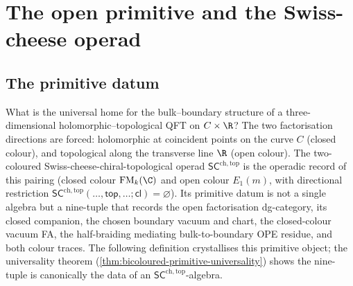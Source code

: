 \providecommand{\Tr}{\operatorname{Tr}}
\providecommand{\Dmod}{D\text{-}\mathsf{mod}}
\providecommand{\Ran}{\mathrm{Ran}}
\providecommand{\Fact}{\mathrm{Fact}}
\providecommand{\Conf}{\mathrm{Conf}}
\providecommand{\IndCoh}{\operatorname{IndCoh}}
\providecommand{\FM}{\mathrm{FM}}
\providecommand{\barB}{\overline{B}}
\providecommand{\SCchtop}{\mathsf{SC}^{\mathrm{ch},\mathrm{top}}}
\providecommand{\RHom}{\mathrm{R}\mathrm{Hom}}
\providecommand{\Repq}{\mathrm{Rep}_q}
\providecommand{\ev}{\mathrm{ev}}
\providecommand{\coev}{\mathrm{coev}}
\providecommand{\ChirHoch}{\mathrm{Ch}\mathrm{Hoch}}
\providecommand{\MHM}{\mathrm{MHM}}
\providecommand{\KZ}{\mathrm{KZ}}
\providecommand{\GRT}{\mathrm{GRT}}
\providecommand{\End}{\mathrm{End}}
\providecommand{\Hom}{\mathrm{Hom}}
\providecommand{\holim}{\mathrm{holim}}
\providecommand{\id}{\mathrm{id}}
\providecommand{\Dco}{D^{\mathrm{co}}}
\providecommand{\Ainf}{A_\infty}
\providecommand{\HH}{\mathrm{HH}}
\providecommand{\Perf}{\mathrm{Perf}}
\providecommand{\cZ}{\mathcal{Z}}
\providecommand{\cO}{\mathcal{O}}
\providecommand{\MC}{\mathrm{MC}}
\providecommand{\gAmod}{\mathfrak{g}_\cA^{\mathrm{mod}}}
\providecommand{\barBch}{\overline{B}^{\mathrm{ch}}}
\providecommand{\Obs}{\mathsf{Obs}}
\providecommand{\DMod}{D\text{-}\mathsf{mod}}
\providecommand{\uHom}{\underline{\mathrm{Hom}}}
\providecommand{\Sym}{\mathrm{Sym}}
\providecommand{\D}{\mathbb{D}}
\providecommand{\dfib}{d_{\mathrm{fib}}}
\providecommand{\Eone}{E_1}
\providecommand{\Omegach}{\Omega^{\mathrm{ch}}}
\section{The open primitive and the Swiss-cheese operad}
\label{sec:foundations}
\label{sec:operads-factorization}

\subsection{The primitive datum}

\noindent
What is the universal home for the bulk--boundary structure of a
three-dimensional holomorphic--topological QFT on $C \times \R$?
The two factorisation directions are forced: holomorphic at
coincident points on the curve $C$ \textup(closed colour\textup),
and topological along the transverse line $\R$ \textup(open
colour\textup). The two-coloured Swiss-cheese-chiral-topological
operad $\SCchtop$ is the operadic record of this pairing
\textup(closed colour $\FM_k(\C)$ and open colour $E_1(m)$, with
directional restriction
$\SCchtop(\ldots, \mathsf{top}, \ldots; \mathsf{cl}) = \varnothing$\textup).
Its primitive datum is not a single algebra but a nine-tuple that
records the open factorisation dg-category, its closed companion,
the chosen boundary vacuum and chart, the closed-colour vacuum FA,
the half-braiding mediating bulk-to-boundary OPE residue, and
both colour traces. The following definition crystallises this
primitive object; the universality theorem
\textup(\cref{thm:bicoloured-primitive-universality}\textup) shows
the nine-tuple is canonically the data of an $\SCchtop$-algebra.

